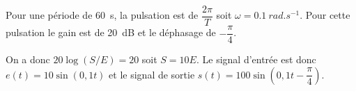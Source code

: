 %



\else 


\fi

\ifprof
Pour une période de \SI{60}{s}, la pulsation est de $\dfrac{2\pi}{T}$ soit $\omega = \SI{0,1}{rad.s^{-1}}$.
Pour cette pulsation le gain est de \SI{20}{dB} et le déphasage de $-\dfrac{\pi}{4}$.

On a donc $20\log(S/E) = 20$ soit $S=10E$. Le signal d'entrée est donc $e(t) = 10 \sin (0,1 t)$ et le signal de sortie  $s(t) = 100 \sin\left(0,1 t - \dfrac{\pi}{4}\right)$.
\else
\fi

\ifprof
\else


\fi

